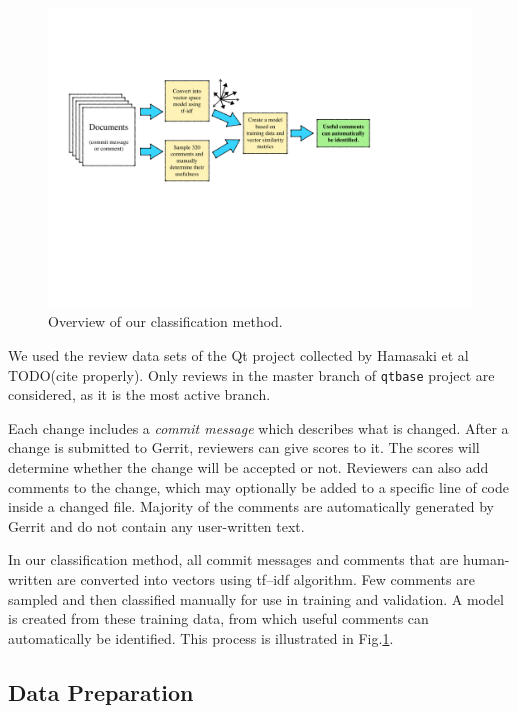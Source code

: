 \documentclass[conference]{IEEEtran}
\begin{document}
\begin{figure}
\centering
\includegraphics[width=6in]{overview}
\caption{Overview of our classification method.}
\label{fig:overview}
\end{figure}

We used the review data sets of the Qt project collected by Hamasaki et al TODO(cite properly).
Only reviews in the master branch of \texttt{qtbase} project are considered,
as it is the most active branch.

Each change includes a \emph{commit message} which describes what is changed.
After a change is submitted to Gerrit, reviewers can give scores to it.
The scores will determine whether the change will be accepted or not.
Reviewers can also add comments to the change, which may optionally be added to a specific line of code inside a changed file.
Majority of the comments are automatically generated by Gerrit and do not contain any user-written text.

In our classification method,
all commit messages and comments that are human-written are converted into vectors using tf--idf algorithm.
Few comments are sampled and then classified manually for use in training and validation.
A model is created from these training data, from which useful comments can automatically be identified.
This process is illustrated in Fig.\ref{fig:overview}.

\subsection{Data Preparation}
\end{document}
